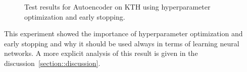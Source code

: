   \begin{figure}[H]
   \centering
   \qquad
   \qquad
   \caption{Test results for Autoencoder on KTH using hyperparameter optimization and early stopping.}
   \label{figure::prednet_mnist_results}
  \end{figure}\noindent
  This experiment showed the importance of hyperparameter optimization and early stopping and why it should be used always in terms of learning neural networks.
  A more explicit analysis of this result is given in the discussion~\ref{section::discussion}.